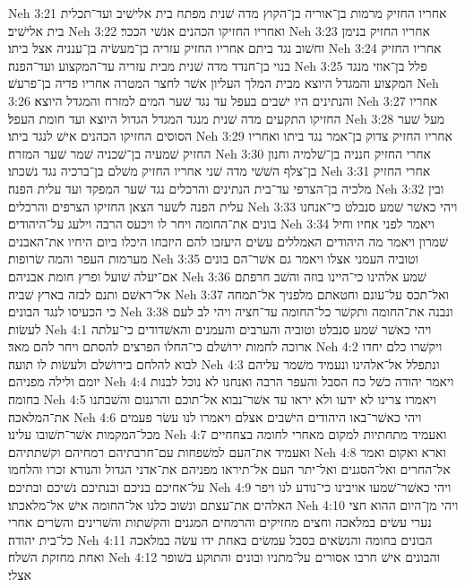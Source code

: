 Neh 3:21  אחריו החזיק מרמות בן־אוריה בן־הקוץ מדה שׁנית מפתח בית אלישׁיב ועד־תכלית בית אלישׁיב׃
Neh 3:22  ואחריו החזיקו הכהנים אנשׁי הככר׃
Neh 3:23  אחריו החזיק בנימן וחשׁוב נגד ביתם אחריו החזיק עזריה בן־מעשׂיה בן־ענניה אצל ביתו׃
Neh 3:24  אחריו החזיק בנוי בן־חנדד מדה שׁנית מבית עזריה עד־המקצוע ועד־הפנה׃
Neh 3:25  פלל בן־אוזי מנגד המקצוע והמגדל היוצא מבית המלך העליון אשׁר לחצר המטרה אחריו פדיה בן־פרעשׁ׃
Neh 3:26  והנתינים היו ישׁבים בעפל עד נגד שׁער המים למזרח והמגדל היוצא׃
Neh 3:27  אחריו החזיקו התקעים מדה שׁנית מנגד המגדל הגדול היוצא ועד חומת העפל׃
Neh 3:28  מעל שׁער הסוסים החזיקו הכהנים אישׁ לנגד ביתו׃
Neh 3:29  אחריו החזיק צדוק בן־אמר נגד ביתו ואחריו החזיק שׁמעיה בן־שׁכניה שׁמר שׁער המזרח׃
Neh 3:30  אחרי החזיק חנניה בן־שׁלמיה וחנון בן־צלף השׁשׁי מדה שׁני אחריו החזיק משׁלם בן־ברכיה נגד נשׁכתו׃
Neh 3:31  אחרי החזיק מלכיה בן־הצרפי עד־בית הנתינים והרכלים נגד שׁער המפקד ועד עלית הפנה׃
Neh 3:32  ובין עלית הפנה לשׁער הצאן החזיקו הצרפים והרכלים׃
Neh 3:33  ויהי כאשׁר שׁמע סנבלט כי־אנחנו בונים את־החומה ויחר לו ויכעס הרבה וילעג על־היהודים׃
Neh 3:34  ויאמר לפני אחיו וחיל שׁמרון ויאמר מה היהודים האמללים עשׂים היעזבו להם היזבחו היכלו ביום היחיו את־האבנים מערמות העפר והמה שׂרופות׃
Neh 3:35  וטוביה העמני אצלו ויאמר גם אשׁר־הם בונים אם־יעלה שׁועל ופרץ חומת אבניהם׃
Neh 3:36  שׁמע אלהינו כי־היינו בוזה והשׁב חרפתם אל־ראשׁם ותנם לבזה בארץ שׁביה׃
Neh 3:37  ואל־תכס על־עונם וחטאתם מלפניך אל־תמחה כי הכעיסו לנגד הבונים׃
Neh 3:38  ונבנה את־החומה ותקשׁר כל־החומה עד־חציה ויהי לב לעם לעשׂות׃
Neh 4:1  ויהי כאשׁר שׁמע סנבלט וטוביה והערבים והעמנים והאשׁדודים כי־עלתה ארוכה לחמות ירושׁלם כי־החלו הפרצים להסתם ויחר להם מאד׃
Neh 4:2  ויקשׁרו כלם יחדו לבוא להלחם בירושׁלם ולעשׂות לו תועה׃
Neh 4:3  ונתפלל אל־אלהינו ונעמיד משׁמר עליהם יומם ולילה מפניהם׃
Neh 4:4  ויאמר יהודה כשׁל כח הסבל והעפר הרבה ואנחנו לא נוכל לבנות בחומה׃
Neh 4:5  ויאמרו צרינו לא ידעו ולא יראו עד אשׁר־נבוא אל־תוכם והרגנום והשׁבתנו את־המלאכה׃
Neh 4:6  ויהי כאשׁר־באו היהודים הישׁבים אצלם ויאמרו לנו עשׂר פעמים מכל־המקמות אשׁר־תשׁובו עלינו׃
Neh 4:7  ואעמיד מתחתיות למקום מאחרי לחומה בצחחיים ואעמיד את־העם למשׁפחות עם־חרבתיהם רמחיהם וקשׁתתיהם׃
Neh 4:8  וארא ואקום ואמר אל־החרים ואל־הסגנים ואל־יתר העם אל־תיראו מפניהם את־אדני הגדול והנורא זכרו והלחמו על־אחיכם בניכם ובנתיכם נשׁיכם ובתיכם׃
Neh 4:9  ויהי כאשׁר־שׁמעו אויבינו כי־נודע לנו ויפר האלהים את־עצתם ונשׁוב כלנו אל־החומה אישׁ אל־מלאכתו׃
Neh 4:10  ויהי מן־היום ההוא חצי נערי עשׂים במלאכה וחצים מחזיקים והרמחים המגנים והקשׁתות והשׁרינים והשׂרים אחרי כל־בית יהודה׃
Neh 4:11  הבונים בחומה והנשׂאים בסבל עמשׂים באחת ידו עשׂה במלאכה ואחת מחזקת השׁלח׃
Neh 4:12  והבונים אישׁ חרבו אסורים על־מתניו ובונים והתוקע בשׁופר אצלי׃
